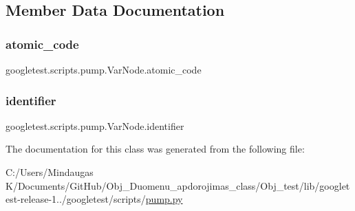 \subsection{Member Data Documentation}
\mbox{\label{classgoogletest_1_1scripts_1_1pump_1_1_var_node_a38d773bd8c03423d0b28ccfda481f64d}} 
\subsubsection{\texorpdfstring{atomic\_code}{atomic\_code}}
{\footnotesize\ttfamily googletest.\+scripts.\+pump.\+Var\+Node.\+atomic\+\_\+code}

\mbox{\label{classgoogletest_1_1scripts_1_1pump_1_1_var_node_a482b5988b73eafee2a0e6994c7415c98}} 
\subsubsection{\texorpdfstring{identifier}{identifier}}
{\footnotesize\ttfamily googletest.\+scripts.\+pump.\+Var\+Node.\+identifier}



The documentation for this class was generated from the following file\+:\begin{DoxyCompactItemize}
\item 
C\+:/\+Users/\+Mindaugas K/\+Documents/\+Git\+Hub/\+Obj\+\_\+\+Duomenu\+\_\+apdorojimas\+\_\+class/\+Obj\+\_\+test/lib/googletest-\/release-\/1../googletest/scripts/\mbox{\hyperlink{_obj__test_2lib_2googletest-release-1_88_81_2googletest_2scripts_2pump_8py}{pump.\+py}}\end{DoxyCompactItemize}

